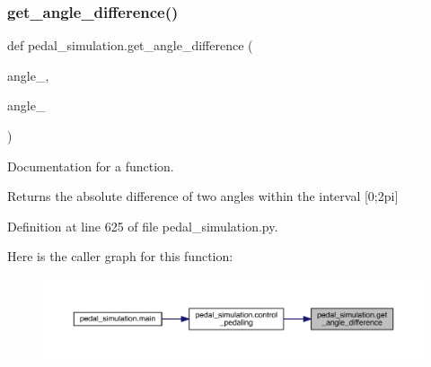 \mbox{\label{namespacepedal__simulation_a33250e7cae81695eb6fdbd17683a77ec}} 
\subsubsection{\texorpdfstring{get\_angle\_difference()}{get\_angle\_difference()}}
{\footnotesize\ttfamily def pedal\+\_\+simulation.\+get\+\_\+angle\+\_\+difference (\begin{DoxyParamCaption}\item[{}]{angle\+\_,  }\item[{}]{angle\+\_ }\end{DoxyParamCaption})}



Documentation for a function. 

Returns the absolute difference of two angles within the interval \mbox{[}0;2pi\mbox{]} 

Definition at line 625 of file pedal\+\_\+simulation.\+py.


\begin{DoxyCode}{0}

\end{DoxyCode}
Here is the caller graph for this function\+:\nopagebreak
\begin{figure}[H]
\begin{center}
\leavevmode
\includegraphics[width=350pt]{namespacepedal__simulation_a33250e7cae81695eb6fdbd17683a77ec_icgraph}
\end{center}
\end{figure}
\mbox{\label{namespacepedal__simulation_adb861e8a115a0b376ef206e7efec9bd0}} 
